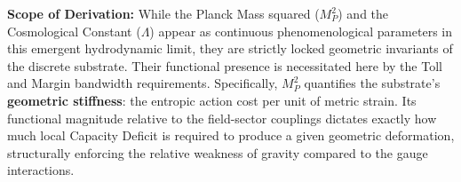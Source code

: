 \textbf{Scope of Derivation:} While the Planck Mass squared ($M_P^2$) and the Cosmological Constant ($\Lambda$) appear as continuous phenomenological parameters in this emergent hydrodynamic limit, they are strictly locked geometric invariants of the discrete substrate. Their functional presence is necessitated here by the Toll and Margin bandwidth requirements.  Specifically, $M_P^2$ quantifies the substrate's \textbf{geometric stiffness}: the entropic action cost per unit of metric strain. Its functional magnitude relative to the field-sector couplings dictates exactly how much local Capacity Deficit is required to produce a given geometric deformation, structurally enforcing the relative weakness of gravity compared to the gauge interactions.
